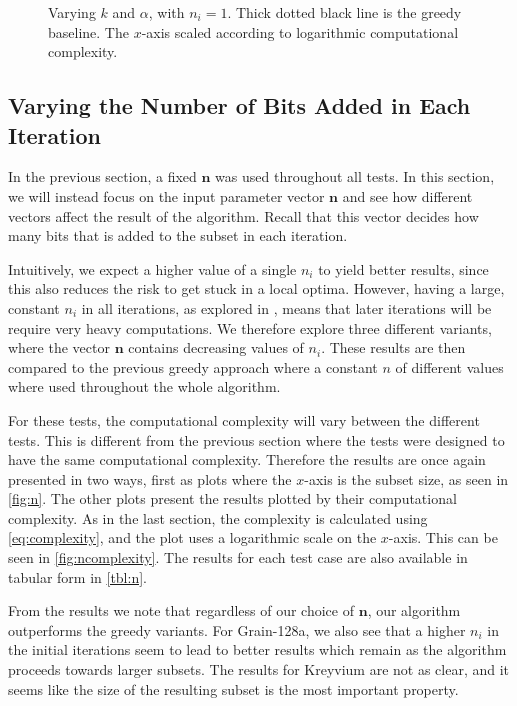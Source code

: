 {\begin{figure}[htbp]
	\caption{Varying $k$ and $\alpha$, with $n_i=1$. Thick dotted black line is the greedy baseline. The $x$-axis scaled according to logarithmic computational complexity.}
	\label{fig:kalphacomplexity}
\end{figure}

\subsection{Varying the Number of Bits Added in Each Iteration}

In the previous section, a fixed $\bm{n}$ was used throughout all tests. In this section, we will instead focus on the input parameter vector $\bm{n}$ and see how different vectors affect the result of the algorithm. Recall that this vector decides how many bits that is added to the subset in each iteration.

Intuitively, we expect a higher value of a single $n_i$ to yield better results, since this also reduces the risk to get stuck in a local optima. However, having a large, constant $n_i$ in all iterations, as explored in \cite{stankovski:2010}, means that later iterations will be require very heavy computations. We therefore explore three different variants, where the vector $\bm{n}$ contains decreasing values of $n_i$. These results are then compared to the previous greedy approach where a constant $n$ of different values where used throughout the whole algorithm.

For these tests, the computational complexity will vary between the different tests. This is different from the previous section where the tests were designed to have the same computational complexity. Therefore the results are once again presented in two ways, first as plots where the $x$-axis is the subset size, as seen in \autoref{fig:n}.
The other plots present the results plotted by their computational complexity. As in the last section, the complexity is calculated using \autoref{eq:complexity}, and the plot uses a logarithmic scale on the $x$-axis. This can be seen in \autoref{fig:ncomplexity}. The results for each test case are also available in tabular form in \autoref{tbl:n}.

From the results we note that regardless of our choice of $\bm{n}$, our algorithm outperforms the greedy variants. For Grain-128a, we also see that a higher $n_i$ in the initial iterations seem to lead to better results which remain as the algorithm proceeds towards larger subsets. The results for Kreyvium are not as clear, and it seems like the size of the resulting subset is the most important property.

}

